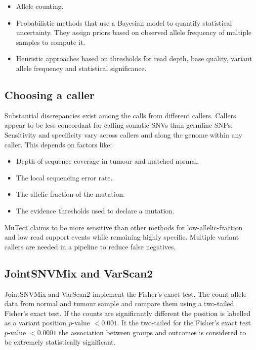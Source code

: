 	\begin{multicols}{2}
		\begin{itemize}
			\item Allele counting.
			\item Probabilistic methods that use a Bayesian model to quantify statistical uncertainty.
				They assign priors based on observed allele frequency of multiple samples to compute it.
			\item Heuristic approaches based on thresholds for read depth, base quality, variant allele frequency and statistical significance.
		\end{itemize}
	\end{multicols}

	\subsection{Choosing a caller}
	Substantial discrepancies exist among the calls from different callers.
	Callers appear to be less concordant for calling somatic SNVs than germline SNPs.
	Sensitivity and specificity vary across callers and along the genome within any caller.
	This depends on factors like:

	\begin{multicols}{2}
		\begin{itemize}
			\item Depth of sequence coverage in tumour and matched normal.
			\item The local sequencing error rate.
			\item The allelic fraction of the mutation.
			\item The evidence thresholds used to declare a mutation.
		\end{itemize}
	\end{multicols}

	MuTect claims to be more sensitive than other methods for low-allelic-fraction and low read support events while remaining highly specific.
	Multiple variant callers are needed in a pipeline to reduce false negatives.

	\subsection{JointSNVMix and VarScan2}
	JointSNVMix and VarScan2 implement the Fisher's exact test.
	The count allele data from normal and tumour sample and compare them using a two-tailed Fisher's exact test.
	If the counts are significantly different the position is labelled as a variant position $p$-value $< 0.001$.
	It the two-tailed for the Fisher's exact test $p$-value $<0.0001$ the association between groups and outcomes is considered to be extremely statistically significant.

